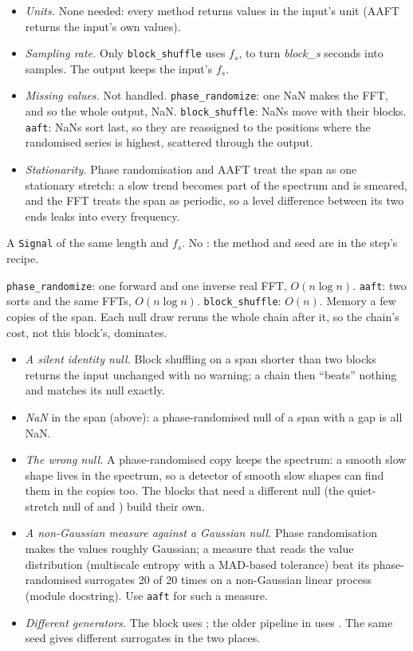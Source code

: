\begin{itemize}
\item \emph{Units.} None needed: every method returns values in the input's unit (AAFT
  returns the input's own values).
\item \emph{Sampling rate.} Only \texttt{block\_shuffle} uses $f_s$, to turn \emph{block\_s}
  seconds into samples. The output keeps the input's $f_s$.
\item \emph{Missing values.} Not handled. \texttt{phase\_randomize}: one NaN makes the FFT,
  and so the whole output, NaN. \texttt{block\_shuffle}: NaNs move with their blocks.
  \texttt{aaft}: NaNs sort last, so they are reassigned to the positions where the
  randomised series is highest, scattered through the output.
\item \emph{Stationarity.} Phase randomisation and AAFT treat the span as one stationary
  stretch: a slow trend becomes part of the spectrum and is smeared, and the FFT treats the
  span as periodic, so a level difference between its two ends leaks into every frequency.
\end{itemize}

A \texttt{Signal} of the same length and $f_s$. No : the method and seed are in
the step's recipe.

\texttt{phase\_randomize}: one forward and one inverse real FFT, $O(n \log n)$. \texttt{aaft}:
two sorts and the same FFTs, $O(n \log n)$. \texttt{block\_shuffle}: $O(n)$. Memory a few
copies of the span. Each null draw reruns the whole chain after it, so the chain's cost, not
this block's, dominates.

\begin{itemize}
\item \emph{A silent identity null.} Block shuffling on a span shorter than two blocks
  returns the input unchanged with no warning; a chain then ``beats'' nothing and matches
  its null exactly.
\item \emph{NaN} in the span (above): a phase-randomised null of a span with a gap is all
  NaN.
\item \emph{The wrong null.} A phase-randomised copy keeps the spectrum: a smooth slow
  shape lives in the spectrum, so a detector of smooth slow shapes can find them in the
  copies too. The blocks that need a different null (the quiet-stretch null of
   and ) build
  their own.
\item \emph{A non-Gaussian measure against a Gaussian null.} Phase randomisation makes the
  values roughly Gaussian; a measure that reads the value distribution (multiscale entropy
  with a MAD-based tolerance) beat its phase-randomised surrogates 20 of 20 times on a
  non-Gaussian linear process (module docstring). Use \texttt{aaft} for such a measure.
\item \emph{Different generators.} The block uses ; the older pipeline
  in  uses . The same seed gives
  different surrogates in the two places.
\end{itemize}

